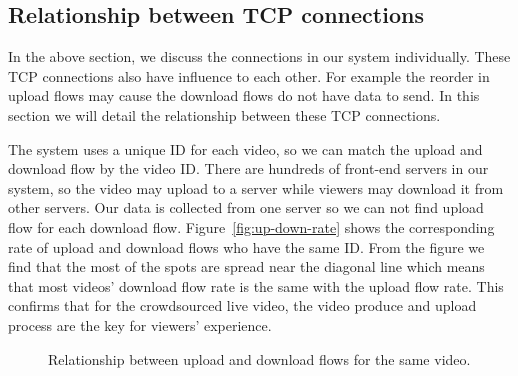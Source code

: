 \subsection{Relationship between TCP connections}
\label{sub:relationship-analysis}
In the above section, we discuss the connections in our system individually. These TCP connections also have influence to each other. For example the reorder in upload flows may cause the download flows do not have data to send. In this section we will detail the relationship between these TCP connections.

The system uses a unique ID for each video, so we can match the upload and download flow by the video ID. There are hundreds of front-end servers in our system, so the video may upload to a server while viewers may download it from other servers. Our data is collected from one server so we can not find upload flow for each download flow. Figure~\ref{fig:up-down-rate} shows the corresponding rate of upload and download flows who have the same ID. From the figure we find that the most of the spots are spread near the diagonal line which means that most videos' download flow rate is the same with the upload flow rate. This confirms that for the crowdsourced live video, the video produce and upload process are the key for viewers' experience.  

\begin{figure}[t]
\centering
{}
\hspace{1em}%
	\hspace{1em}%
\caption{Relationship between upload and download flows for the same video.}
\label{fig:relationship-up-down} %
\termspace
\end{figure}



